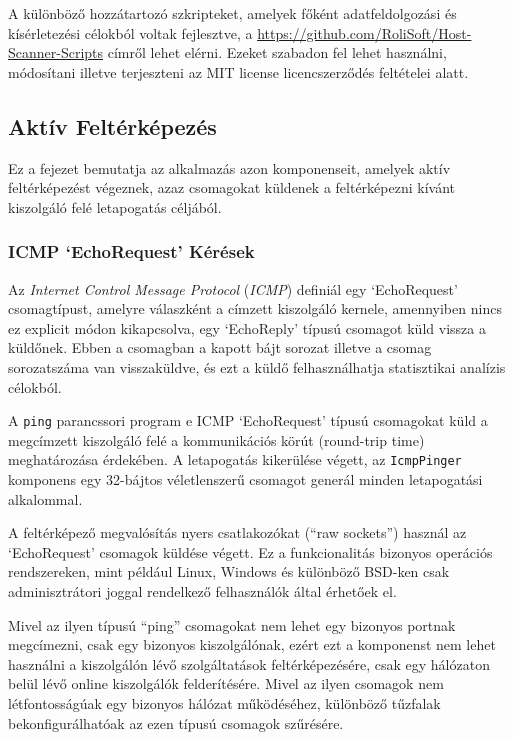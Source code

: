 	A különböző hozzátartozó szkripteket, amelyek főként adatfeldolgozási és kísérletezési célokból voltak fejlesztve, a \url{https://github.com/RoliSoft/Host-Scanner-Scripts} címről lehet elérni. Ezeket szabadon fel lehet használni, módosítani illetve terjeszteni az MIT license\cite{mit} licencszerződés feltételei alatt.

\subsection*{Aktív Feltérképezés}

	Ez a fejezet bemutatja az alkalmazás azon komponenseit, amelyek aktív feltérképezést végeznek, azaz csomagokat küldenek a feltérképezni kívánt kiszolgáló felé letapogatás céljából.

\subsubsection*{ICMP `EchoRequest' Kérések}

	Az \textit{Internet Control Message Protocol} (\textit{ICMP}) definiál egy `EchoRequest' csomagtípust, amelyre válaszként a címzett kiszolgáló kernele, amennyiben nincs ez explicit módon kikapcsolva, egy `EchoReply' típusú csomagot küld vissza a küldőnek. Ebben a csomagban a kapott bájt sorozat illetve a csomag sorozatszáma van visszaküldve, és ezt a küldő felhasználhatja statisztikai analízis célokból.

	A \texttt{ping} parancssori program e ICMP `EchoRequest' típusú csomagokat küld a megcímzett kiszolgáló felé a kommunikációs körút (round-trip time) meghatározása érdekében. A letapogatás kikerülése végett, az \texttt{IcmpPinger} komponens egy 32-bájtos véletlenszerű csomagot generál minden letapogatási alkalommal.
	
	A feltérképező megvalósítás nyers csatlakozókat (``raw sockets'') használ az `EchoRequest' csomagok küldése végett. Ez a funkcionalitás bizonyos operációs rendszereken, mint például Linux, Windows és különböző BSD-ken csak adminisztrátori joggal rendelkező felhasználók által érhetőek el.

	Mivel az ilyen típusú ``ping'' csomagokat nem lehet egy bizonyos portnak megcímezni, csak egy bizonyos kiszolgálónak, ezért ezt a komponenst nem lehet használni a kiszolgálón lévő szolgáltatások feltérképezésére, csak egy hálózaton belül lévő online kiszolgálók felderítésére. Mivel az ilyen csomagok nem létfontosságúak egy bizonyos hálózat működéséhez, különböző tűzfalak bekonfigurálhatóak az ezen típusú csomagok szűrésére.

